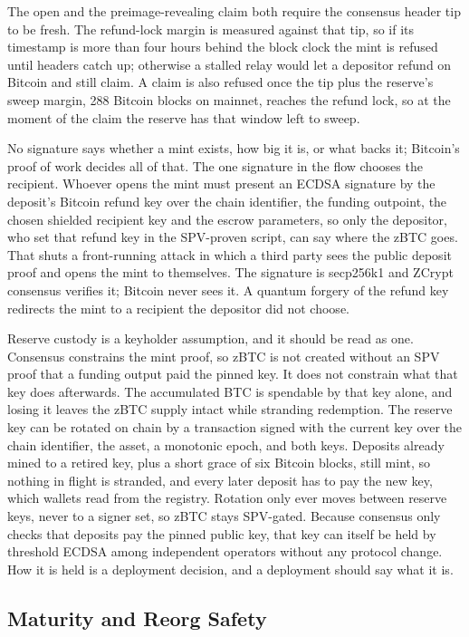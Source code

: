 \documentclass[twocolumn,10pt]{article}
\begin{document}
The open and the preimage-revealing claim both require the consensus header tip to be fresh. The refund-lock margin is measured against that tip, so if its timestamp is more than four hours behind the block clock the mint is refused until headers catch up; otherwise a stalled relay would let a depositor refund on Bitcoin and still claim. A claim is also refused once the tip plus the reserve's sweep margin, 288 Bitcoin blocks on mainnet, reaches the refund lock, so at the moment of the claim the reserve has that window left to sweep.

No signature says whether a mint exists, how big it is, or what backs it; Bitcoin's proof of work decides all of that. The one signature in the flow chooses the recipient. Whoever opens the mint must present an ECDSA signature by the deposit's Bitcoin refund key over the chain identifier, the funding outpoint, the chosen shielded recipient key and the escrow parameters, so only the depositor, who set that refund key in the SPV-proven script, can say where the zBTC goes. That shuts a front-running attack in which a third party sees the public deposit proof and opens the mint to themselves. The signature is secp256k1 and ZCrypt consensus verifies it; Bitcoin never sees it. A quantum forgery of the refund key redirects the mint to a recipient the depositor did not choose.

Reserve custody is a keyholder assumption, and it should be read as one. Consensus constrains the mint proof, so zBTC is not created without an SPV proof that a funding output paid the pinned key. It does not constrain what that key does afterwards. The accumulated BTC is spendable by that key alone, and losing it leaves the zBTC supply intact while stranding redemption. The reserve key can be rotated on chain by a transaction signed with the current key over the chain identifier, the asset, a monotonic epoch, and both keys. Deposits already mined to a retired key, plus a short grace of six Bitcoin blocks, still mint, so nothing in flight is stranded, and every later deposit has to pay the new key, which wallets read from the registry. Rotation only ever moves between reserve keys, never to a signer set, so zBTC stays SPV-gated. Because consensus only checks that deposits pay the pinned public key, that key can itself be held by threshold ECDSA among independent operators without any protocol change. How it is held is a deployment decision, and a deployment should say what it is.

\subsection{Maturity and Reorg Safety}
\end{document}

